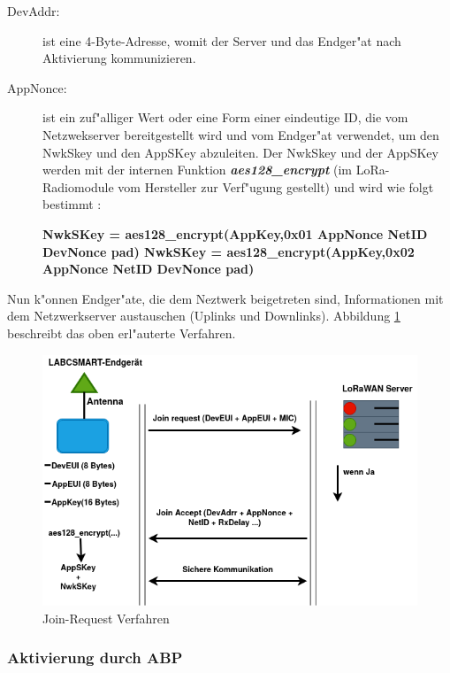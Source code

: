 \begin{description}
	\item[DevAddr:] ist eine 4-Byte-Adresse, womit der Server und das 
	Endger"at nach Aktivierung kommunizieren.   
	
	\item[AppNonce:] ist ein zuf"alliger Wert oder eine Form einer 
	eindeutige ID, die vom Netzwekserver bereitgestellt wird und vom 
	Endger"at verwendet, um den NwkSkey und den AppSKey abzuleiten.
	Der NwkSkey und der AppSKey werden mit der internen Funktion   
	\textbf{\textit{aes128\_encrypt}} (im LoRa-Radiomodule vom 
	Hersteller zur Verf"ugung gestellt) und wird wie folgt bestimmt 
	\cite{LoRaWAN}:
	
	\textbf{NwkSKey = aes128\_encrypt(AppKey,0x01 \textbar AppNonce 
	\textbar NetID \textbar DevNonce \textbar pad)
	NwkSKey = aes128\_encrypt(AppKey,0x02 \textbar AppNonce \textbar 
	NetID \textbar DevNonce \textbar pad)} 
\end{description}

Nun k"onnen Endger"ate, die dem Neztwerk beigetreten sind, Informationen 
mit dem Netzwerkserver austauschen (Uplinks und Downlinks). Abbildung 
\ref{fig:request} beschreibt das oben erl"auterte Verfahren.


\begin{figure}[h]
	\centering
	\includegraphics[width=14cm]{source/images/Join-Procedure}
	\caption{Join-Request Verfahren\label{fig:request}}
\end{figure}


\vspace{10cm}
\subsubsection{Aktivierung durch ABP}

